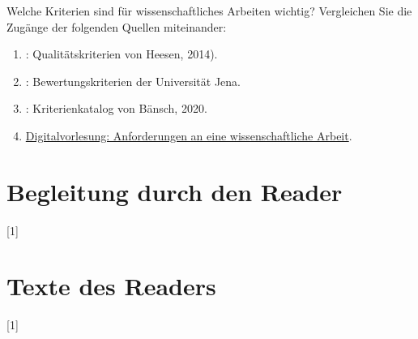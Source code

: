 \documentclass[a4paper]{article}%
\begin{document}

Welche Kriterien sind für wissenschaftliches Arbeiten wichtig?
Vergleichen Sie die Zugänge der folgenden Quellen miteinander:

\begin{enumerate}
\item {}: Qualitätskriterien von Heesen, 2014).
\item {}: Bewertungskriterien der Universität Jena.
\item {}: Kriterienkatalog von Bänsch, 2020.
\item \hyperlink{Digitalvorlesung}{Digitalvorlesung: Anforderungen an eine wissenschaftliche Arbeit}.
\end{enumerate}


\clearpage


\stopcontents[part1]



\newpage

\clearpage


\part{Begleitung durch den Reader}\label{Reader1}

\startcontents[part2]
[1]{}

\clearpage

















%




\clearpage

\stopcontents[part2]



\part{Texte des Readers}

\startcontents[part3]
[1]{}
\end{document}
